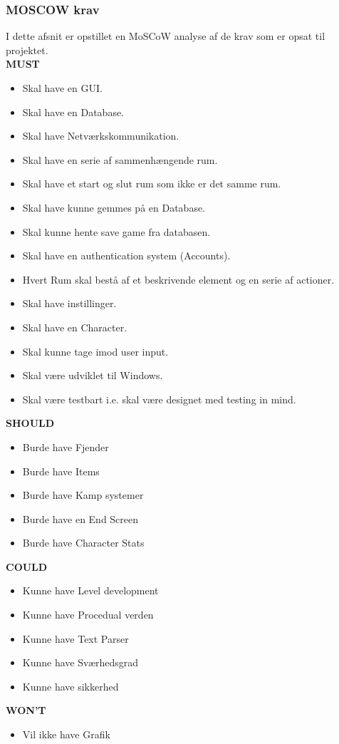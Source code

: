 \subsubsection{MOSCOW krav}
\label{sssec:MOSCOW}
I dette afsnit er opstillet en MoSCoW analyse af de krav som er opsat til projektet.\\

\textbf{MUST}
\begin{itemize}
  \item Skal have en GUI.
  \item Skal have en Database.
  \item Skal have Netværkskommunikation.
  \item Skal have en serie af sammenhængende rum.
  \item Skal have et start og slut rum som ikke er det samme rum.
  \item Skal have kunne gemmes på en Database.
  \item Skal kunne hente save game fra databasen.
  \item Skal have en authentication system (Accounts).
  \item Hvert Rum skal bestå af et beskrivende element og en serie af actioner.
  \item Skal have instillinger.
  \item Skal have en Character.
  \item Skal kunne tage imod user input.
  \item Skal være udviklet til Windows.
  \item Skal være testbart i.e. skal være designet med testing in mind.
\end{itemize}


\textbf{SHOULD}
\begin{itemize}
  \item Burde have Fjender
  \item Burde have Items
  \item Burde have Kamp systemer
  \item Burde have en End Screen
  \item Burde have Character Stats
\end{itemize}

\textbf{COULD}

\begin{itemize}
  \item Kunne have Level development
  \item Kunne have Procedual verden
  \item Kunne have Text Parser
  \item Kunne have Sværhedsgrad
  \item Kunne have sikkerhed
\end{itemize}

\textbf{WON'T}
\begin{itemize}
  \item Vil ikke have Grafik
\end{itemize}

 
